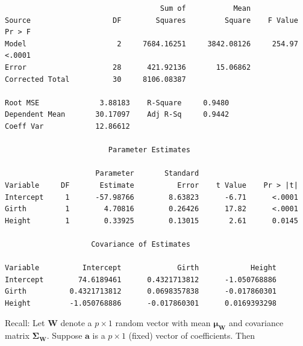 \documentclass{report}
\begin{document}
\begin{large}
\begin{verbatim}
                                    Sum of           Mean
Source                   DF        Squares         Square    F Value    Pr > F
Model                     2     7684.16251     3842.08126     254.97    <.0001
Error                    28      421.92136       15.06862
Corrected Total          30     8106.08387

Root MSE              3.88183    R-Square     0.9480
Dependent Mean       30.17097    Adj R-Sq     0.9442
Coeff Var            12.86612

                        Parameter Estimates

                     Parameter       Standard
Variable     DF       Estimate          Error    t Value    Pr > |t|
Intercept     1      -57.98766        8.63823      -6.71      <.0001
Girth         1        4.70816        0.26426      17.82      <.0001
Height        1        0.33925        0.13015       2.61      0.0145

                    Covariance of Estimates

Variable          Intercept             Girth            Height
Intercept        74.6189461      0.4321713812      -1.050768886
Girth          0.4321713812      0.0698357838      -0.017860301
Height         -1.050768886      -0.017860301      0.0169393298
\end{verbatim}
\end{large}



Recall: Let $\textbf{W}$ denote a $p\times 1$ random vector with mean $\boldsymbol{\mu}_{\textbf{W}}$ 
and covariance matrix $\boldsymbol{\Sigma}_{\textbf{W}}$. Suppose $\textbf{a}$ is a $p\times 1$ (fixed) vector of coefficients. Then 
\begin{center}
\end{center}
\end{document}
